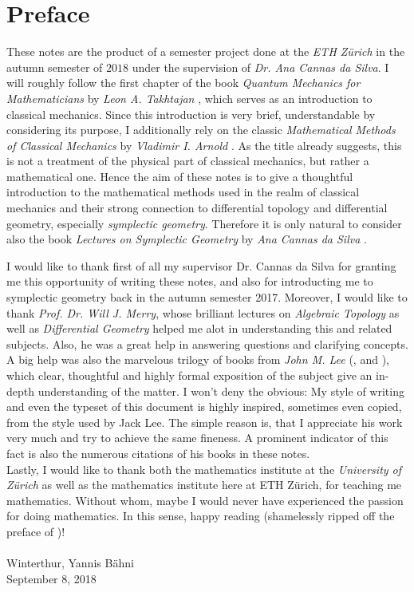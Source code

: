 \chapter*{Preface}
These notes are the product of a semester project done at the \emph{ETH Z\"urich} in the autumn semester of $2018$ under the supervision of \emph{Dr. Ana Cannas da Silva}. I will roughly follow the first chapter of the book \emph{Quantum Mechanics for Mathematicians} by \emph{Leon A. Takhtajan} \cite{takhtajan:QM:2008}, which serves as an introduction to classical mechanics. Since this introduction is very brief, understandable by considering its purpose, I additionally rely on the classic \emph{Mathematical Methods of Classical Mechanics} by \emph{Vladimir I. Arnold} \cite{arnold:CM:1989}. As the title already suggests, this is not a treatment of the physical part of classical mechanics, but rather a mathematical one. Hence the aim of these notes is to give a thoughtful introduction to the mathematical methods used in the realm of classical mechanics and their strong connection to differential topology and differential geometry, especially \emph{symplectic geometry}. Therefore it is only natural to consider also the book \emph{Lectures on Symplectic Geometry} by \emph{Ana Cannas da Silva} \cite{silva:SG:2008}.

I would like to thank first of all my supervisor Dr. Cannas da Silva for granting me this opportunity of writing these notes, and also for introducting me to symplectic geometry back in the autumn semester 2017. Moreover, I would like to thank \emph{Prof. Dr. Will J. Merry}, whose brilliant lectures on \emph{Algebraic Topology} as well as \emph{Differential Geometry} helped me alot in understanding this and related subjects. Also, he was a great help in answering questions and clarifying concepts. A big help was also the marvelous trilogy of books from \emph{John M. Lee} (\cite{lee:topological_manifolds:2011}, \cite{lee:smooth_manifolds:2013} and \cite{lee:Riemannian_manifolds:1997}), which clear, thoughtful and highly formal exposition of the subject give an in-depth understanding of the matter. I won't deny the obvious: My style of writing and even the typeset of this document is highly inspired, sometimes even copied, from the style used by Jack Lee. The simple reason is, that I appreciate his work very much and try to achieve the same fineness. A prominent indicator of this fact is also the numerous citations of his books in these notes.\\
Lastly, I would like to thank both the mathematics institute at the \emph{University of Z\"urich} as well as the mathematics institute here at ETH Z\"urich, for teaching me mathematics. Without whom, maybe I would never have experienced the passion for doing mathematics. In this sense, happy reading (shamelessly ripped off the preface of \cite{lee:smooth_manifolds:2013})!\\ 
\newline\\
\noindent Winterthur, \hfill Yannis B\"ahni\\
September 8, 2018

